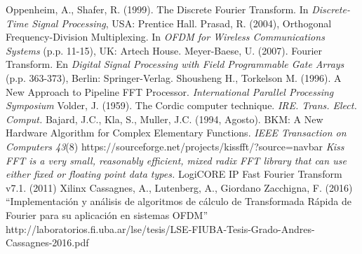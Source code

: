 \documentclass[conference]{IEEEtran}
\begin{document}


%
%
%



\begin{thebibliography}{1}
               Oppenheim, A., Shafer, R. (1999). The Discrete Fourier Transform. In
                                    \textit{Discrete-Time Signal Processing}, USA: Prentice Hall.
                 Prasad, R. (2004), Orthogonal Frequency-Division Multiplexing. 
                                    In \textit{OFDM for Wireless Communications Systems} (p.p. 11-15), UK: Artech House.
                Meyer-Baese, U. (2007). Fourier Transform. En \textit{Digital Signal Processing
                                    with Field Programmable Gate Arrays} (p.p. 363-373), Berlin: Springer-Verlag.
                 Shousheng H., Torkelson M. (1996). A New Approach to Pipeline FFT Processor.
                                    \textit{International Parallel Processing Symposium}
                    Volder, J. (1959). The Cordic computer technique. \textit{IRE. Trans. Elect. Comput.}
                       Bajard, J.C., Kla, S., Muller, J.C. (1994, Agosto). BKM: A New Hardware Algorithm for
                                    Complex Elementary Functions. \textit{IEEE Transaction on Computers 43}(8)
                   https://sourceforge.net/projects/kissfft/?source=navbar \textit{Kiss FFT is a very small, 
                                    reasonably efficient, mixed radix FFT library that can use either fixed or floating point data
                                    types.}
                 LogiCORE IP Fast Fourier Transform v7.1. (2011) Xilinx
                     Cassagnes, A., Lutenberg, A., Giordano Zacchigna, F. (2016) ``Implementación y análisis de algoritmos
                                    de cálculo de Transformada Rápida de Fourier para su aplicación en sistemas OFDM'' 
                                    http://laboratorios.fi.uba.ar/lse/tesis/LSE-FIUBA-Tesis-Grado-Andres-Cassagnes-2016.pdf
\end{thebibliography}
\end{document}
